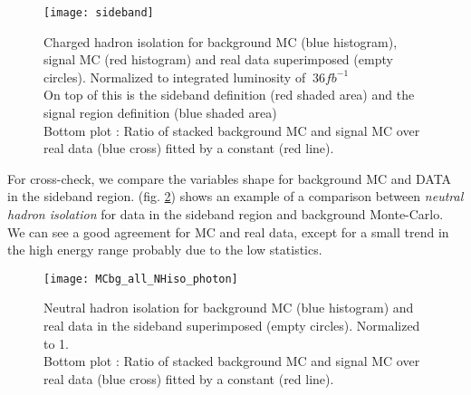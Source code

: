 
\begin{figure}[ht!]
  \centering
  \texttt{[image: sideband]}\\[1cm]
  \caption{Charged hadron isolation for background MC (blue histogram), signal MC (red histogram) and real data superimposed (empty circles). Normalized to integrated luminosity of $~36fb^{-1}$\\On top of this is the sideband definition (red shaded area) and the signal region definition (blue shaded area)\\Bottom plot : Ratio of stacked background MC and signal MC over real data (blue cross) fitted by a constant (red line).}
  \label{sideband}
\end{figure}

For cross-check, we compare the variables shape for background MC and DATA in the sideband region.
(fig. \ref{MCbg_all_NHiso_photon}) shows an example of a comparison between \emph{neutral hadron isolation} for data in the sideband region and background Monte-Carlo. We can see a good agreement for MC and real data, except for a small trend in the high energy range probably due to the low statistics.
\begin{figure}[h!]
  \centering
  \texttt{[image: MCbg\_all\_NHiso\_photon]}\\[1cm]
  \caption{Neutral hadron isolation for background MC (blue histogram) and real data in the sideband superimposed (empty circles). Normalized to 1.\\Bottom plot : Ratio of stacked background MC and signal MC over real data (blue cross) fitted by a constant (red line).}
  \label{MCbg_all_NHiso_photon}
\end{figure}

